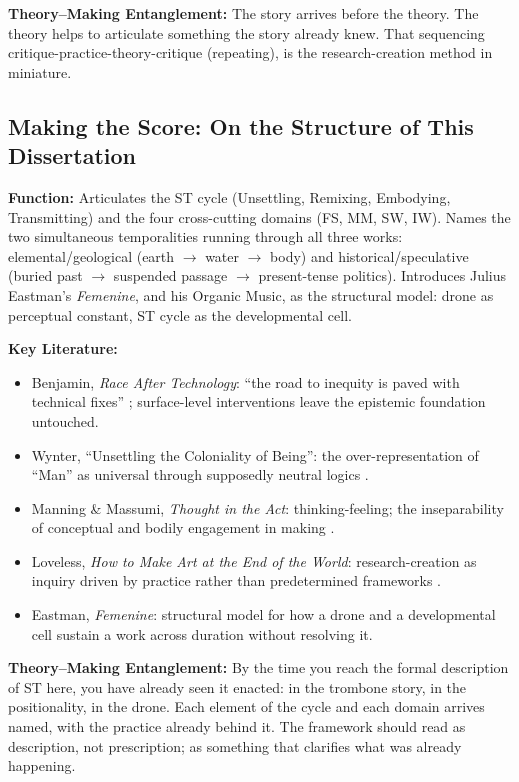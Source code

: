\noindent\textbf{Theory--Making Entanglement:} The story arrives before the theory. The theory helps to articulate something the story already knew. That sequencing critique-practice-theory-critique (repeating), is the research-creation method in miniature.

\bigskip

\subsection*{Making the Score: On the Structure of This Dissertation}

\noindent\textbf{Function:} Articulates the ST cycle (Unsettling, Remixing, Embodying, Transmitting) and the four cross-cutting domains (FS, MM, SW, IW). Names the two simultaneous temporalities running through all three works: elemental/geological (earth $\to$ water $\to$ body) and historical/speculative (buried past $\to$ suspended passage $\to$ present-tense politics). Introduces Julius Eastman's \textit{Femenine}, and his Organic Music, as the structural model: drone as perceptual constant, ST cycle as the developmental cell.

\noindent\textbf{Key Literature:}
\begin{itemize}[noitemsep]
    \item Benjamin, \textit{Race After Technology}: ``the road to inequity is paved with technical fixes'' \parencite{Benjamin_2019a}; surface-level interventions leave the epistemic foundation untouched.
    \item Wynter, ``Unsettling the Coloniality of Being'': the over-representation of ``Man'' as universal through supposedly neutral logics \parencite{Wynter_2003}.
    \item Manning \& Massumi, \textit{Thought in the Act}: thinking-feeling; the inseparability of conceptual and bodily engagement in making \parencite{Manning_Massumi_2014}.
    \item Loveless, \textit{How to Make Art at the End of the World}: research-creation as inquiry driven by practice rather than predetermined frameworks \parencite{Loveless_2019}.
    \item Eastman, \textit{Femenine}: structural model for how a drone and a developmental cell sustain a work across duration without resolving it.
\end{itemize}

\noindent\textbf{Theory--Making Entanglement:} By the time you reach the formal description of ST here, you have already seen it enacted: in the trombone story, in the positionality, in the drone. Each element of the cycle and each domain arrives named, with the practice already behind it. The framework should read as description, not prescription; as something that clarifies what was already happening.

